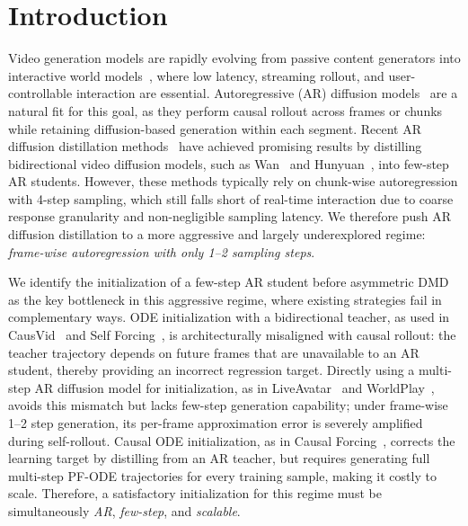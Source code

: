 \documentclass{llmxive}
\begin{document}
\section{Introduction}
Video generation models are rapidly evolving from passive content generators into interactive world models~\cite{videoworldsimulators2024, bao2024vidu,wan2025wan,kong2024hunyuanvideo,yang2024cogvideox,lin2024open,zheng2024open,sun2025worldplay,genie3,huang2025live,ki2026avatar,sun2025streamavatar,feng2025vidarc,ye2026worldactionmodelszeroshot}, where low latency, streaming rollout, and user-controllable interaction are essential. Autoregressive (AR) diffusion models~\cite{jin2024pyramidal,teng2025magi,chen2025skyreels} are a natural fit for this goal, as they perform causal rollout across frames or chunks while retaining diffusion-based generation within each segment. Recent AR diffusion distillation methods~\cite{yin2025slow,huang2025self,zhu2026causal,huang2025live,sun2025worldplay} have achieved promising results by distilling bidirectional video diffusion models, such as Wan~\cite{wan2025wan} and Hunyuan~\cite{kong2024hunyuanvideo}, into few-step AR students. However, these methods typically rely on chunk-wise autoregression with 4-step sampling, which still falls short of real-time interaction due to coarse response granularity and non-negligible sampling latency.  We therefore push AR diffusion distillation to a more aggressive and largely underexplored regime: \emph{frame-wise autoregression with only 1--2 sampling steps}.

We identify the initialization of a few-step AR student before asymmetric DMD as the key bottleneck in this aggressive regime, where existing strategies fail in complementary ways. ODE initialization with a bidirectional teacher, as used in CausVid~\cite{yin2025slow} and Self Forcing~\cite{huang2025self}, is architecturally misaligned with causal rollout: the teacher trajectory depends on future frames that are unavailable to an AR student, thereby providing an incorrect regression target. Directly using a multi-step AR diffusion model for initialization, as in LiveAvatar~\cite{huang2025live} and WorldPlay~\cite{sun2025worldplay}, avoids this mismatch but lacks few-step generation capability; under frame-wise 1--2 step generation, its per-frame approximation error is severely amplified during self-rollout. Causal ODE initialization, as in Causal Forcing~\cite{zhu2026causal}, corrects the learning target by distilling from an AR teacher, but requires generating full multi-step PF-ODE trajectories for every training sample, making it costly to scale. Therefore, a satisfactory initialization for this regime must be simultaneously \emph{AR}, \emph{few-step}, and \emph{scalable}.
\end{document}
